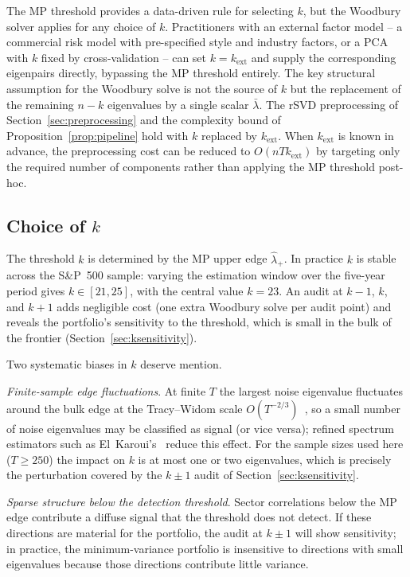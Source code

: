 \begin{remark}\label{rem:external_factors}
The MP threshold provides a data-driven rule for selecting $k$, but the Woodbury
solver applies for any choice of $k$. Practitioners with an external factor model --
a commercial risk model with pre-specified style and industry factors, or a PCA
with $k$ fixed by cross-validation -- can set $k = k_{\mathrm{ext}}$ and supply
the corresponding eigenpairs directly, bypassing the MP threshold entirely. The
key structural assumption for the Woodbury solve is not the source of $k$ but
the replacement of the remaining $n - k$ eigenvalues by a single scalar $\bar\lambda$.
The rSVD preprocessing of Section~\ref{sec:preprocessing} and the complexity
bound of Proposition~\ref{prop:pipeline} hold with $k$ replaced by $k_{\mathrm{ext}}$.
When $k_{\mathrm{ext}}$ is known in advance, the preprocessing cost can be reduced
to $O(nTk_{\mathrm{ext}})$ by targeting only the required number of components
rather than applying the MP threshold post-hoc.
\end{remark}

\subsection{Choice of \texorpdfstring{$k$}{k}}\label{ssec:k_selection}

The threshold $k$ is determined by the MP upper edge $\hat\lambda_+$. In practice
$k$ is stable across the S\&P~500 sample: varying the estimation window over the
five-year period gives $k \in [21, 25]$, with the central value $k = 23$.
An audit at $k - 1$, $k$, and $k + 1$ adds negligible cost (one extra
Woodbury solve per audit point) and reveals the portfolio's sensitivity to the
threshold, which is small in the bulk of the frontier (Section~\ref{sec:ksensitivity}).

Two systematic biases in $k$ deserve mention.

\emph{Finite-sample edge fluctuations}. At finite $T$ the largest noise
eigenvalue fluctuates around the bulk edge at the Tracy--Widom scale
$O(T^{-2/3})$~\cite{johnstone2001}, so a small number of noise eigenvalues may
be classified as signal (or vice versa); refined spectrum estimators such as
El~Karoui's~\cite{elkaroui2008} reduce this effect. For the sample sizes used
here ($T \geq 250$) the impact on $k$ is at most one or two eigenvalues, which
is precisely the perturbation covered by the $k \pm 1$ audit of
Section~\ref{sec:ksensitivity}.

\emph{Sparse structure below the detection threshold}. Sector correlations below
the MP edge contribute a diffuse signal that the threshold does not detect. If
these directions are material for the portfolio, the audit at $k \pm 1$ will
show sensitivity; in practice, the minimum-variance portfolio is insensitive to
directions with small eigenvalues because those directions contribute little
variance.
